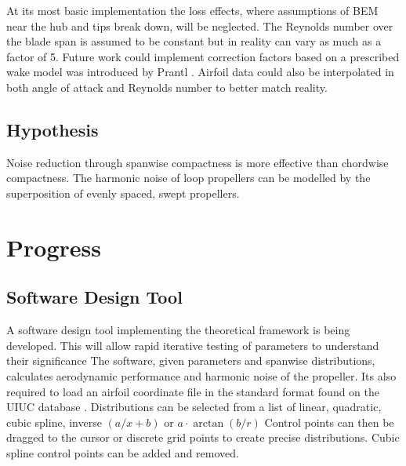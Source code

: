 \documentclass{article}
\begin{document}
At its most basic implementation the loss effects, where assumptions of BEM near the hub and tips break down, will be neglected.
The Reynolds number over the blade span is assumed to be constant but in reality can vary as much as a factor of 5.
Future work could implement correction factors based on a prescribed wake model was introduced by Prantl \cite{prandtl_loss}.
Airfoil data could also be interpolated in both angle of attack and Reynolds number to better match reality.
\subsection{Hypothesis}
Noise reduction through spanwise compactness is more effective than chordwise compactness.
The harmonic noise of loop propellers can be modelled by the superposition of evenly spaced, swept propellers.

\section{Progress}

\subsection{Software Design Tool}

A software design tool implementing the theoretical framework is being developed.
This will allow rapid iterative testing of parameters to understand their significance 
The software, given parameters and spanwise distributions, calculates aerodynamic performance and harmonic noise of the propeller.
Its also required to load an airfoil coordinate file in the standard format found on the UIUC database \cite{UIUC_database}.
Distributions can be selected from a list of linear, quadratic, cubic spline, inverse $(a/x + b)$ or $a \cdot \arctan(b/r)$
Control points can then be dragged to the cursor or discrete grid points to create precise distributions.
Cubic spline control points can be added and removed.
\end{document}
